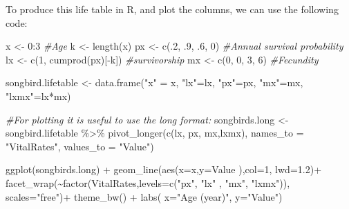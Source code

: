 \documentclass[
]{book}
\newenvironment{Shaded}{\begin{snugshade}}{\end{snugshade}}
\newcommand{\AttributeTok}[1]{\textcolor[rgb]{0.77,0.63,0.00}{#1}}
\newcommand{\CommentTok}[1]{\textcolor[rgb]{0.56,0.35,0.01}{\textit{#1}}}
\newcommand{\DecValTok}[1]{\textcolor[rgb]{0.00,0.00,0.81}{#1}}
\newcommand{\FloatTok}[1]{\textcolor[rgb]{0.00,0.00,0.81}{#1}}
\newcommand{\FunctionTok}[1]{\textcolor[rgb]{0.00,0.00,0.00}{#1}}
\newcommand{\NormalTok}[1]{#1}
\newcommand{\OtherTok}[1]{\textcolor[rgb]{0.56,0.35,0.01}{#1}}
\newcommand{\SpecialCharTok}[1]{\textcolor[rgb]{0.00,0.00,0.00}{#1}}
\newcommand{\StringTok}[1]{\textcolor[rgb]{0.31,0.60,0.02}{#1}}
\begin{document}
To produce this life table in R, and plot the columns, we can use the following code:

\begin{Shaded}
\begin{Highlighting}[]
\NormalTok{x }\OtherTok{\textless{}{-}} \DecValTok{0}\SpecialCharTok{:}\DecValTok{3} \CommentTok{\#Age}
\NormalTok{k }\OtherTok{\textless{}{-}} \FunctionTok{length}\NormalTok{(x) }
\NormalTok{px }\OtherTok{\textless{}{-}} \FunctionTok{c}\NormalTok{(.}\DecValTok{2}\NormalTok{, .}\DecValTok{9}\NormalTok{, .}\DecValTok{6}\NormalTok{, }\DecValTok{0}\NormalTok{) }\CommentTok{\#Annual survival probability}
\NormalTok{lx }\OtherTok{\textless{}{-}} \FunctionTok{c}\NormalTok{(}\DecValTok{1}\NormalTok{, }\FunctionTok{cumprod}\NormalTok{(px)[}\SpecialCharTok{{-}}\NormalTok{k]) }\CommentTok{\#survivorship }
\NormalTok{mx }\OtherTok{\textless{}{-}} \FunctionTok{c}\NormalTok{(}\DecValTok{0}\NormalTok{, }\DecValTok{0}\NormalTok{, }\DecValTok{3}\NormalTok{, }\DecValTok{6}\NormalTok{) }\CommentTok{\#Fecundity}

\NormalTok{songbird.lifetable }\OtherTok{\textless{}{-}} \FunctionTok{data.frame}\NormalTok{(}\StringTok{"x"} \OtherTok{=}\NormalTok{ x, }\StringTok{"lx"}\OtherTok{=}\NormalTok{lx, }\StringTok{"px"}\OtherTok{=}\NormalTok{px, }\StringTok{"mx"}\OtherTok{=}\NormalTok{mx, }\StringTok{"lxmx"}\OtherTok{=}\NormalTok{lx}\SpecialCharTok{*}\NormalTok{mx)}

\CommentTok{\#For plotting it is useful to use the long format:}
\NormalTok{songbirds.long }\OtherTok{\textless{}{-}}\NormalTok{ songbird.lifetable }\SpecialCharTok{\%\textgreater{}\%} \FunctionTok{pivot\_longer}\NormalTok{(}\FunctionTok{c}\NormalTok{(lx, px,  mx,lxmx),}
               \AttributeTok{names\_to =} \StringTok{"VitalRates"}\NormalTok{, }\AttributeTok{values\_to =} \StringTok{"Value"}\NormalTok{)}
 
\FunctionTok{ggplot}\NormalTok{(songbirds.long) }\SpecialCharTok{+} 
  \FunctionTok{geom\_line}\NormalTok{(}\FunctionTok{aes}\NormalTok{(}\AttributeTok{x=}\NormalTok{x,}\AttributeTok{y=}\NormalTok{Value ),}\AttributeTok{col=}\DecValTok{1}\NormalTok{, }\AttributeTok{lwd=}\FloatTok{1.2}\NormalTok{)}\SpecialCharTok{+}
  \FunctionTok{facet\_wrap}\NormalTok{(}\SpecialCharTok{\textasciitilde{}}\FunctionTok{factor}\NormalTok{(VitalRates,}\AttributeTok{levels=}\FunctionTok{c}\NormalTok{(}\StringTok{"px"}\NormalTok{, }\StringTok{"lx"}\NormalTok{ , }\StringTok{"mx"}\NormalTok{, }\StringTok{"lxmx"}\NormalTok{)), }\AttributeTok{scales=}\StringTok{"free"}\NormalTok{)}\SpecialCharTok{+}
  \FunctionTok{theme\_bw}\NormalTok{() }\SpecialCharTok{+}
  \FunctionTok{labs}\NormalTok{( }\AttributeTok{x=}\StringTok{"Age (year)"}\NormalTok{, }\AttributeTok{y=}\StringTok{"Value"}\NormalTok{)}
\end{Highlighting}
\end{Shaded}
\end{document}
